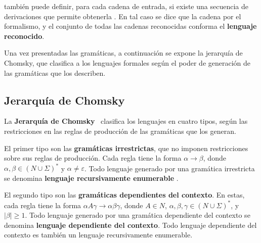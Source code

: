 \documentclass{report}
\theoremstyle{definition}
\theoremstyle{plain}
\theoremstyle{remark}
\begin{document}
 también puede definir, para cada cadena de entrada, si existe una secuencia de derivaciones que permite obtenerla \agregaesto{[REF]}.  En tal caso se dice que la cadena  por el formalismo, y el conjunto de todas las cadenas reconocidas conforma el \textbf{lenguaje reconocido}. 

Una vez presentadas las gramáticas, a continuación se expone la jerarquía de Chomsky, que clasifica a los lenguajes formales según el poder de generación de las gramáticas que los describen.

\subsection{Jerarquía de Chomsky}

La \textbf{Jerarquía de Chomsky}~\cite{hunter2020chomsky} clasifica los lenguajes en cuatro tipos, según las restricciones en las reglas de producción de las gramáticas que los generan.

El primer tipo son las \textbf{gramáticas irrestrictas}, que no imponen restricciones sobre sus reglas de producción. Cada regla tiene la forma $\alpha \to \beta$, donde $\alpha, \beta \in (N \cup \Sigma)^*$ y $\alpha \neq \varepsilon$. Todo lenguaje generado por una gramática irrestricta se denomina \textbf{lenguaje recursivamente enumerable} \agregaesto{[REF]}.

El segundo tipo son las \textbf{gramáticas dependientes del contexto}.  En estas, cada regla tiene la forma $\alpha A \gamma \to \alpha \beta \gamma$, donde $A \in N$, $\alpha, \beta, \gamma \in (N \cup \Sigma)^*$, y $|\beta| \ge 1$. Todo lenguaje generado por una gramática dependiente del contexto se denomina \textbf{lenguaje dependiente del contexto}.  Todo lenguaje dependiente del contexto es también un lenguaje recursivamente enumerable. 
\end{document}
